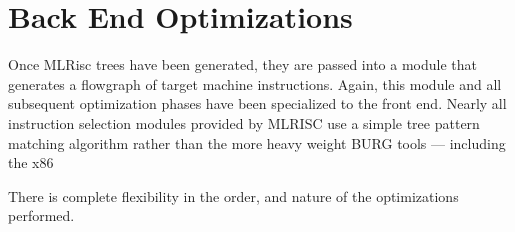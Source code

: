 \section{Back End Optimizations}

  Once MLRisc trees have been generated, they are passed into a module
  that generates a flowgraph of target machine instructions. Again,
  this module and all subsequent optimization phases have been
  specialized to the front end.  
   Nearly all
  instruction selection modules provided by MLRISC use a simple tree
  pattern matching algorithm rather than the more heavy weight BURG
  tools --- including the x86  There is complete flexibility in the order,
  and nature of the optimizations performed. 
